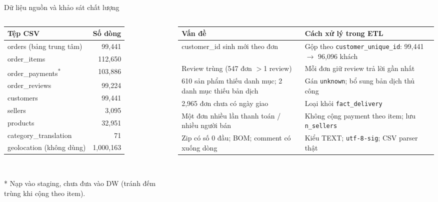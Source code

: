 \documentclass[aspectratio=169,10pt,xcolor=table]{beamer}
\begin{document}
\begin{frame}{Dữ liệu nguồn và khảo sát chất lượng}
  \begin{columns}[T]
    \begin{column}{0.4\textwidth}
      \footnotesize
      \begin{tabular}{@{}lr@{}}
        \toprule
        Tệp CSV & Số dòng\\
        \midrule
        orders (bảng trung tâm) & 99,441\\
        order\_items & 112,650\\
        order\_payments\textsuperscript{*} & 103,886\\
        order\_reviews & 99,224\\
        customers & 99,441\\
        sellers & 3,095\\
        products & 32,951\\
        category\_translation & 71\\
        \textcolor{muted}{geolocation (không dùng)} & \textcolor{muted}{1,000,163}\\
        \bottomrule
      \end{tabular}\\[0.1cm]
      {\tiny\color{muted}* Nạp vào staging, chưa đưa vào DW (tránh đếm trùng khi cộng theo item).\par}
    \end{column}
    \begin{column}{0.57\textwidth}
      \footnotesize
      \renewcommand{\arraystretch}{1.15}
      \begin{tabular}{@{}P{3.1cm}P{4.3cm}@{}}
        \toprule
        Vấn đề & Cách xử lý trong ETL\\
        \midrule
        customer\_id sinh mới theo đơn & Gộp theo \texttt{customer\_unique\_id}: 99,441 $\to$ 96,096 khách\\
        Review trùng (547 đơn $>$1 review) & Mỗi đơn giữ review trả lời gần nhất\\
        610 sản phẩm thiếu danh mục; 2 danh mục thiếu bản dịch & Gán \texttt{unknown}; bổ sung bản dịch thủ công\\
        2,965 đơn chưa có ngày giao & Loại khỏi \texttt{fact\_delivery}\\
        Một đơn nhiều lần thanh toán / nhiều người bán & Không cộng payment theo item; lưu \texttt{n\_sellers}\\
        Zip có số 0 đầu; BOM; comment có xuống dòng & Kiểu TEXT; \texttt{utf-8-sig}; CSV parser thật\\
        \bottomrule
      \end{tabular}
    \end{column}
  \end{columns}
\end{frame}
\end{document}
